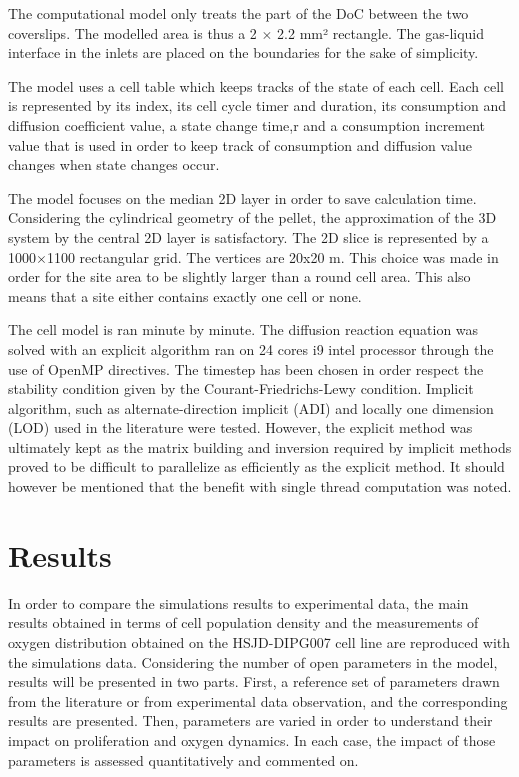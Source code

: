 \documentclass[11pt,a4paper]{article}
\begin{document}
The computational model only treats the part of the DoC between the two coverslips. The modelled area is thus a 2 $\times$ 2.2 mm² rectangle. The gas-liquid interface in the inlets are placed on the boundaries for the sake of simplicity. 

The model uses a cell table which keeps tracks of the state of each cell. Each cell is represented by its index, its cell cycle timer and duration, its consumption and  diffusion coefficient value, a state change time,r and a consumption increment value that is used in order to keep track of consumption and diffusion value changes when state changes occur.

The model focuses on the median 2D layer in order to save calculation time. Considering the cylindrical geometry of the pellet, the approximation of the 3D system by the central 2D layer is satisfactory. The 2D slice is represented by a 1000$\times$1100 rectangular grid. The vertices are 20x20 \textmu m. This choice was made in order for the site area to be slightly larger than a round cell area. This also means that a site either contains exactly one cell or none.

The cell model is ran minute by minute. The diffusion reaction equation was solved with an explicit algorithm ran on 24 cores i9 intel processor through the use of OpenMP directives. The timestep has been chosen in order respect the stability condition given by the Courant-Friedrichs-Lewy condition. Implicit algorithm, such as alternate-direction implicit (ADI) and locally one dimension (LOD) used in the literature were tested.\cite{Kempf2005}\cite{Ghaffarizadeh2015}\cite{Ghaffarizadeh2017}\cite{Mao2018} However, the explicit method was ultimately kept as the matrix building and inversion required by implicit methods proved to be difficult to parallelize as efficiently as the explicit method. It should however be mentioned that the benefit with single thread computation was noted.


\section{Results}
In order to compare the simulations results to experimental data, the main results obtained in terms of cell population density and the measurements of oxygen distribution obtained on the HSJD-DIPG007 cell line are reproduced with the simulations data. Considering the number of open parameters in the model, results will be presented in two parts. First, a reference set of parameters drawn from the literature or from experimental data observation, and the corresponding results are presented. Then, parameters are varied in order to understand their impact on proliferation and oxygen dynamics. In each case, the impact of those parameters is assessed quantitatively and commented on.
\end{document}
